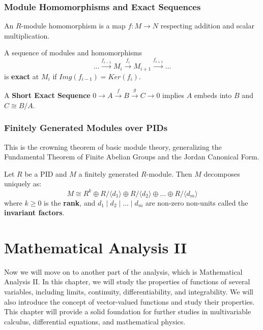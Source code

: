 \documentclass[oneside]{book}
\begin{document}
\subsection{Module Homomorphisms and Exact Sequences}

\begin{definition}
An $R$-module homomorphism is a map $f: M \to N$ respecting addition and scalar multiplication.
\end{definition}

\begin{definition}
A sequence of modules and homomorphisms
\[ \dots \xrightarrow{f_{i-1}} M_{i} \xrightarrow{f_i} M_{i+1} \xrightarrow{f_{i+1}} \dots \]
is \textbf{exact} at $M_i$ if $Img(f_{i-1}) = Ker(f_i)$.
\end{definition}

A \textbf{Short Exact Sequence} $0 \to A \xrightarrow{f} B \xrightarrow{g} C \to 0$ implies $A$ embeds into $B$ and $C \cong B/A$.

\subsection{Finitely Generated Modules over PIDs}

This is the crowning theorem of basic module theory, generalizing the Fundamental Theorem of Finite Abelian Groups and the Jordan Canonical Form.

\begin{theorem}
Let $R$ be a PID and $M$ a finitely generated $R$-module. Then $M$ decomposes uniquely as:
\[ M \cong R^k \oplus R/\langle d_1 \rangle \oplus R/\langle d_2 \rangle \oplus \dots \oplus R/\langle d_m \rangle \]
where $k \geq 0$ is the \textbf{rank}, and $d_1 \mid d_2 \mid \dots \mid d_m$ are non-zero non-units called the \textbf{invariant factors}.
\end{theorem}


\chapter{Mathematical Analysis II}

Now we will move on to another part of the analysis, which is Mathematical Analysis II. In this chapter, we will study the properties of functions of several variables, including limits, continuity, differentiability, and integrability. We will also introduce the concept of vector-valued functions and study their properties. This chapter will provide a solid foundation for further studies in multivariable calculus, differential equations, and mathematical physics.
\end{document}
